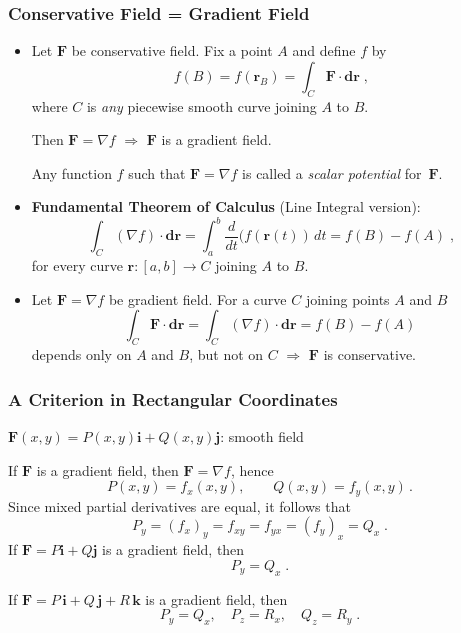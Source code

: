 \begin{frame}
  \frametitle{Conservative Field = Gradient Field}

  \begin{itemize}
    \item Let $\textbf{F}$ be conservative field. \pause Fix a point $A$ and define $f$ by
%
$$f(B)= f(\textbf{r}_B) = \int_C \textbf{F} \cdot \textbf{dr} \; ,$$
%
where $C$ is \emph{any} piecewise smooth curve joining $A$ to $B$.

\pause Then $\textbf{F} = \nabla f$ $\Longrightarrow$ $\textbf{F}$ is a gradient field.

Any function $f$ such that $\textbf{F}= \nabla f$ is called a \emph{scalar potential} for~$\textbf{F}$.

\item \pause
\textbf{Fundamental Theorem of Calculus} (Line Integral version):
%
$$\int_C (\nabla f) \cdot \textbf{dr} = \int_a^b \frac{d}{dt} (f(\textbf{r}(t)) \, dt = f(B) - f(A) \; ,$$
%
for every curve $\textbf{r} \colon [a,b] \to C$ joining $A$ to $B$.

 \item \pause Let $\textbf{F} = \nabla f$ be gradient field. \pause For a curve $C$ joining points $A$ and $B$
 $$\int_C \textbf{F} \cdot \textbf{dr} =  \int_C (\nabla f )\cdot \textbf{dr}= f(B) - f(A)\;$$
\pause depends only on $A$ and $B$, but not on $C$ $\Longrightarrow$ $\textbf{F}$ is conservative.
  \end{itemize}

\end{frame}


\begin{frame}
  \frametitle{A Criterion in Rectangular Coordinates}

$\textbf{F}(x,y) = P(x,y) \textbf{i} + Q(x,y) \textbf{j}$: smooth field

If $\textbf{F}$ is a gradient field, then $\textbf{F} = \nabla f$, hence
%
$$P(x,y) = f_x(x,y), \qquad Q(x,y) = f_y(x,y)\, .$$
%
\pause Since mixed partial derivatives are equal, it follows that
%
$$P_y = (f_x)_y = f_{xy} = f_{yx} = (f_y)_x = Q_x \; .$$
%
\pause If $\textbf{F} = P \textbf{i} + Q \textbf{j}$ is a gradient field, then
%
$$P_y = Q_x \; .$$

\pause If $\textbf{F} = P\, \textbf{i} + Q\, \textbf{j}+ R\, \textbf{k}$ is a gradient field, then
%
$$P_y = Q_x, \quad P_z = R_x, \quad Q_z=R_y\; .$$
%

\end{frame}


